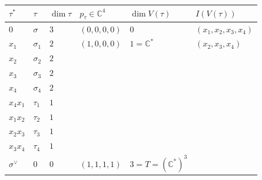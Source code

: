 \documentclass[a4paper,12pt]{amsart}
\newcommand{\CC}{\mathbb{C}}
\begin{document}
\begin{center}
\begin{tabular}{|l|l|l|l|l|l|}
\hline
\textbf{$\tau ^*$} & \textbf{$\tau$} & \textbf{$\dim \tau$} & \textbf{$p_\tau \in \CC^4$} & \textbf{$\dim V(\tau)$} & \textbf{$I(V(\tau))$} \\ \hline
$0$ & $\sigma$  & $3$ &  $(0,0,0,0)$ & $0$ & $(x_1, x_2, x_3, x_4)$ \\ \hline
$x_1$ & $\sigma_1$  & $2$ & $(1,0,0,0)$   & $1 = \CC^*$  & $(x_2, x_3, x_4)$  \\ \hline
$x_2$ & $\sigma_2$ &  $2$ & &  &  \\ \hline
$x_3$ & $\sigma_3$ &  $2$ & &  &  \\ \hline
$x_4$ & $\sigma_4$ &  $2$ & &  &  \\ \hline
$x_4 x_1$ & $\tau_1$  & $1$ &  &  &  \\ \hline
$x_1 x_2$ & $\tau_2$ & $1$ &  &  &  \\ \hline
$x_2 x_3$ & $\tau_3$ & $1$ &  &  &  \\ \hline
$x_3 x_4$ & $\tau_4$ & $1$  &  &  &  \\ \hline
$\sigma^\vee$ & $0$  & $0$ & $(1,1,1,1)$  & $3 = T = (\CC^*)^3$  &  \\ \hline
\end{tabular}
\end{center}
\end{document}
